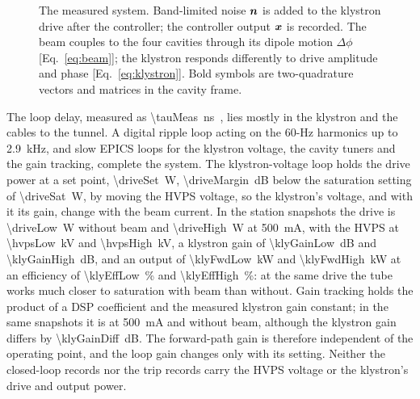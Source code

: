 \begin{figure}[tb]
\centering
\resizebox{\columnwidth}{!}{}
\caption{The measured system. Band-limited noise $\bm{n}$ is added to the klystron drive after the controller; the controller output $\bm{x}$ is recorded. The beam couples to the four cavities through its dipole motion $\Delta\phi$ [Eq.~\eqref{eq:beam}]; the klystron responds differently to drive amplitude and phase [Eq.~\eqref{eq:klystron}]. Bold symbols are two-quadrature vectors and matrices in the cavity frame.}\label{fig:loop}
\end{figure} The loop delay, measured as \SI{\tauMeas}{ns}~\cite{Sebek2026}, lies mostly in the klystron and the cables to the tunnel. A digital ripple loop acting on the 60-Hz harmonics up to \SI{2.9}{kHz}, and slow EPICS loops for the klystron voltage, the cavity tuners and the gain tracking, complete the system. The klystron-voltage loop holds the drive power at a set point, \SI{\driveSet}{W}, \SI{\driveMargin}{dB} below the saturation setting of \SI{\driveSat}{W}, by moving the HVPS voltage, so the klystron's voltage, and with it its gain, change with the beam current. In the station snapshots the drive is \SI{\driveLow}{W} without beam and \SI{\driveHigh}{W} at \SI{500}{mA}, with the HVPS at \SI{\hvpsLow}{kV} and \SI{\hvpsHigh}{kV}, a klystron gain of \SI{\klyGainLow}{dB} and \SI{\klyGainHigh}{dB}, and an output of \SI{\klyFwdLow}{kW} and \SI{\klyFwdHigh}{kW} at an efficiency of \SI{\klyEffLow}{\percent} and \SI{\klyEffHigh}{\percent}: at the same drive the tube works much closer to saturation with beam than without. Gain tracking holds the product of a DSP coefficient and the measured klystron gain constant; in the same snapshots it is \gaintrackHigh{} at \SI{500}{mA} and \gaintrackLow{} without beam, although the klystron gain differs by \SI{\klyGainDiff}{dB}. The forward-path gain is therefore independent of the operating point, and the loop gain changes only with its setting. Neither the closed-loop records nor the trip records carry the HVPS voltage or the klystron's drive and output power.

